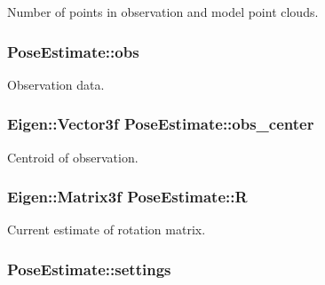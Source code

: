 \-Number of points in observation and model point clouds. 

\hypertarget{classPoseEstimate_a75beb14fe9fd10fc8a80eff84f348c1c}{
\subsubsection[{obs}]{ {\bf \-Pose\-Estimate\-::obs}}}\label{classPoseEstimate_a75beb14fe9fd10fc8a80eff84f348c1c}


\-Observation data. 

\hypertarget{classPoseEstimate_a3431f3d795bc7e5ec3108c923cf4eb9f}{
\subsubsection[{obs\-\_\-center}]{\setlength{\rightskip}{0pt plus 5cm}\-Eigen\-::\-Vector3f {\bf \-Pose\-Estimate\-::obs\-\_\-center}}}\label{classPoseEstimate_a3431f3d795bc7e5ec3108c923cf4eb9f}


\-Centroid of observation. 

\hypertarget{classPoseEstimate_a45910f753f4c92260252d965af504cc8}{
\subsubsection[{\-R}]{\setlength{\rightskip}{0pt plus 5cm}\-Eigen\-::\-Matrix3f {\bf \-Pose\-Estimate\-::\-R}}}\label{classPoseEstimate_a45910f753f4c92260252d965af504cc8}


\-Current estimate of rotation matrix. 

\hypertarget{classPoseEstimate_ae1d0b8586991b50d575afa6b8bae92da}{
\subsubsection[{settings}]{ {\bf \-Pose\-Estimate\-::settings}}}\label{classPoseEstimate_ae1d0b8586991b50d575afa6b8bae92da}


